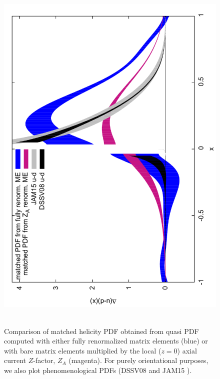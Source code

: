 \begin{itemize}
\begin{figure}[h!]
\includegraphics[scale=0.4,angle=-90]{plots/qmatched_bare_vs_fit69v2}\,\,\,
\vspace*{-0.3cm}
\begin{minipage}{15cm}
\hspace*{3cm}
\caption{Comparison of matched helicity PDF obtained from quasi PDF computed with either fully renormalized matrix elements (blue) 
or with bare matrix elements multiplied by the local ($z{=}0$) axial current $Z$-factor, $Z_A$ (magenta). For purely orientational purposes, 
we also plot phenomenological PDFs (DSSV08 \cite{deFlorian:2009vb} and JAM15 \cite{Sato:2016tuz}).}
\label{fig:matched} 
\end{minipage}
\end{figure}


\end{itemize}
